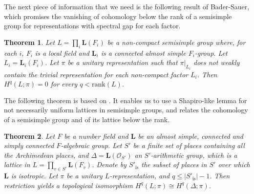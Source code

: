 \documentclass[12pt,reqno]{amsart}
\newtheorem{theorem}{Theorem}[section]
\theoremstyle{definition}
\newcommand{\abs}[1]{\left| #1 \right|}
\begin{document}
The next piece of information that we need is the following result of Bader-Sauer, which promises the vanishing of cohomology below the rank of a semisimple group for representations with spectral gap for each factor.
\begin{theorem}\cite[Theorem~5.6]{BaderSauer}\label{thm:BS vanishing semisimple}
    Let $L=\prod_i \mathbf{L}(F_i)$ be a non-compact semisimple group where, for each $i$, $F_i$ is a local field and $\mathbf{L}_i$ is a connected almost simple $F_i$-group. Let $L_i=\mathbf{L}_i(F_i)$. Let $\pi$ be a unitary representation such that $\pi|_{L_i}$ does not weakly contain the trivial representation for each non-compact factor $L_i$. Then $H^q(L;\pi)=0$ for every $q < \mathrm{rank}(L)$.
\end{theorem}

The following theorem is based on \cite[\S6]{BaderSauer}. It enables us to use a Shapiro-like lemma for not necessarily uniform lattices in semisimple groups, and relates the cohomology of a semisimple group and of its lattice below the rank.
\begin{theorem}\label{lem:poly shapiro}
    Let $F$ be a number field and $\mathbf{L}$ be an almost simple, connected and simply connected $F$-algebraic group. Let $S'$ be a finite set of places containing all the Archimedean places, and $\Delta=\mathbf{L}(\mathcal O_{S'})$ an $S'$-arithmetic group, which is a lattice in $L=\prod_{v \in S'}\mathbf{L}(F_v)$. Denote by $S'_{\mathrm{is}}$ the subset of places in $S'$ over which $\mathbf{L}$ is isotropic. Let $\pi$ be a unitary $L$-representation, and $q \leq \abs{S'_\mathrm{is}}-1$. Then restriction yields a topological isomorphism $H^q(L;\pi) \cong H^q(\Delta;\pi)$.
\end{theorem}
\end{document}
